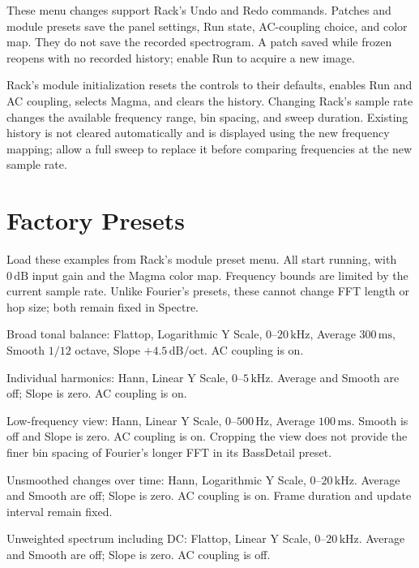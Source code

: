 \documentclass[12pt,letterpaper]{article}
\begin{document}
These menu changes support Rack's Undo and Redo commands. Patches and module
presets save the panel settings, Run state, AC-coupling choice, and color map.
They do not save the recorded spectrogram. A patch saved while frozen reopens
with no recorded history; enable Run to acquire a new image.

Rack's module initialization resets the controls to their defaults, enables
Run and AC coupling, selects Magma, and clears the history. Changing Rack's
sample rate changes the available frequency range, bin spacing, and sweep
duration. Existing history is not cleared automatically and is displayed
using the new frequency mapping; allow a full sweep to replace it before
comparing frequencies at the new sample rate.

\clearpage
\section{Factory Presets}

Load these examples from Rack's module preset menu. All start running, with
$0\,\mathrm{dB}$ input gain and the Magma color map. Frequency bounds are
limited by the current sample rate. Unlike Fourier's presets, these cannot
change FFT length or hop size; both remain fixed in Spectre.

\begin{description}[style=nextline, leftmargin=0pt, labelwidth=0pt, labelsep=0pt]
  \item[Mastering] Broad tonal balance: Flattop, Logarithmic Y Scale,
  $0$--$20\,\mathrm{kHz}$, Average $300\,\mathrm{ms}$, Smooth $1/12$ octave,
  Slope $+4.5\,\mathrm{dB/oct}$. AC coupling is on.
  \item[Harmonics] Individual harmonics: Hann, Linear Y Scale,
  $0$--$5\,\mathrm{kHz}$. Average and Smooth are off; Slope is zero.
  AC coupling is on.
  \item[BassDetail] Low-frequency view: Hann, Linear Y Scale,
  $0$--$500\,\mathrm{Hz}$, Average $100\,\mathrm{ms}$. Smooth is off and
  Slope is zero. AC coupling is on. Cropping the view does not provide the
  finer bin spacing of Fourier's longer FFT in its BassDetail preset.
  \item[Transients] Unsmoothed changes over time: Hann, Logarithmic Y Scale,
  $0$--$20\,\mathrm{kHz}$. Average and Smooth are off; Slope is zero.
  AC coupling is on. Frame duration and update interval remain fixed.
  \item[PluginDevelopment] Unweighted spectrum including DC: Flattop,
  Linear Y Scale, $0$--$20\,\mathrm{kHz}$. Average and Smooth are off;
  Slope is zero. AC coupling is off.
\end{description}
\end{document}
